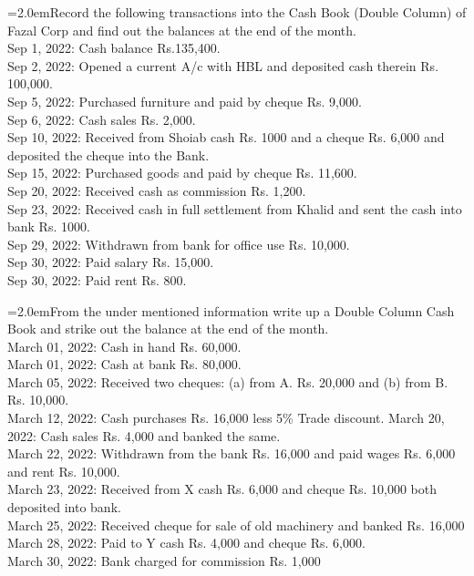 \documentclass[11pt,a4paper]{article}
\newcommand{\lqn}[2]{\Needspace{6\baselineskip}\par\medskip\noindent\hangindent=2.0em\hangafter=1\makebox[2.0em][l]{\textbf{#1.}}#2\par}
\begin{document}
\lqn{60}{Record the following transactions into the Cash Book (Double Column) of Fazal Corp and find out the balances at the end of the month.\\
Sep 1, 2022:      Cash balance Rs.135,400.\\
Sep 2, 2022:      Opened a current A/c with HBL and deposited cash therein Rs. 100,000.\\
Sep 5, 2022:      Purchased furniture and paid by cheque Rs. 9,000.\\
Sep 6, 2022:      Cash sales Rs. 2,000.\\
Sep 10, 2022:    Received from Shoiab cash Rs. 1000 and a cheque Rs. 6,000 and deposited the cheque into the Bank.\\
Sep 15, 2022:    Purchased goods and paid by cheque Rs. 11,600.\\
Sep 20, 2022:    Received cash as commission Rs. 1,200.\\
Sep 23, 2022:    Received cash in full settlement from Khalid and sent the cash into bank Rs. 1000.\\
Sep 29, 2022:    Withdrawn from bank for office use Rs. 10,000.\\
Sep 30, 2022:    Paid salary Rs. 15,000.\\
Sep 30, 2022:    Paid rent Rs. 800.\par
}
\lqn{61}{From the under mentioned information write up a Double Column Cash Book and strike out the balance at the end of the month.\\
March 01, 2022: Cash in hand Rs. 60,000.\\
March 01, 2022: Cash at bank Rs. 80,000.\\
March 05, 2022: Received two cheques: (a) from A. Rs. 20,000 and (b) from B. Rs. 10,000.\\
March 12, 2022: Cash purchases Rs. 16,000 less 5\% Trade discount. March 20, 2022: Cash sales Rs. 4,000 and banked the same.\\
March 22, 2022: Withdrawn from the bank Rs. 16,000 and paid wages Rs. 6,000 and rent Rs. 10,000.\\
March 23, 2022: Received from X cash Rs. 6,000 and cheque Rs. 10,000 both deposited into bank.\\
March 25, 2022: Received cheque for sale of old machinery and banked Rs. 16,000\\
March 28, 2022: Paid to Y cash Rs. 4,000 and cheque Rs. 6,000.\\
March 30, 2022: Bank charged for commission Rs. 1,000\par
}
\end{document}
